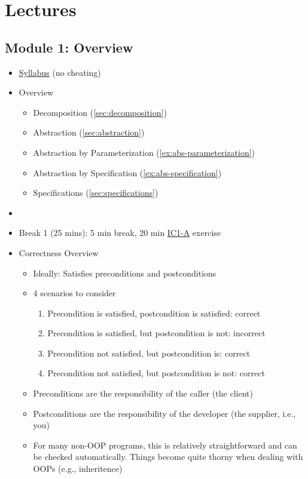 \documentclass[oneside,11pt,dvipsnames]{book}
\begin{document}
\appendix
\chapter{Lectures}

\section{Module 1: Overview}
\begin{itemize}
\item \href{https://nguyenthanhvuh.github.io/class-oo/syllabus.pdf}{Syllabus}  (no cheating)
\item Overview 
\begin{itemize}
    \item Decomposition (\autoref{sec:decomposition})
    \item Abstraction (\autoref{sec:abstraction})
    \item Abstraction by Parameterization (\autoref{ex:abs-parameterization})
    \item Abstraction by Specification (\autoref{ex:abs-specification})
    \item Specifications (\autoref{sec:specifications})
\end{itemize}\item 


\item Break 1 (25 mins):  5 min break,  20 min \href{https://nguyenthanhvuh.github.io/class-oo/assignments#ic1-a}{IC1-A} exercise


\item{Correctness Overview}
\begin{itemize}
    \item Ideally: Satisfies preconditions and postconditions
    \item 4 scenarios to consider
    \begin{enumerate}
        \item Precondition is satisfied, postcondition is satisfied: correct
        \item Precondition is satisfied, but postcondition is not: incorrect
        \item Precondition not satisfied, but postcondition is: correct
        \item Precondition not satisfied, but postcondition is not: correct
    \end{enumerate}
    \item Preconditions are the responsibility of the caller (the client)
    \item Postconditions are the responsibility of the developer (the supplier, i.e., you)
    \item For many non-OOP programs, this is relatively straightforward and can be checked automatically.  Things become quite thorny when dealing with OOPs (e.g., inheritence)
\end{itemize}


\end{itemize}
\end{document}
